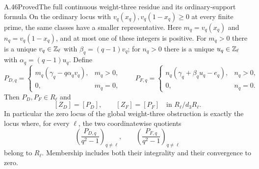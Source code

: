 \begin{statement}{A.46}{Proved}{The full continuous weight-three residue and its ordinary-support formula}
On the ordinary locus with $v_q(x_q),v_q(1-x_q)\ge0$ at every
finite prime, the same classes have a smaller representative.
Here $m_q=v_q(x_q)$ and $n_q=v_q(1-x_q)$, and at most one
of these integers is positive.  For $m_q>0$ there is a unique
$v_q\in\mathbb Z_\ell$ with $\beta_q=(q-1)v_q$; for $n_q>0$ there
is a unique $u_q\in\mathbb Z_\ell$ with $\alpha_q=(q-1)u_q$.
Define
\[
 P_{D,q}=
 \begin{cases}
 m_q(\gamma_q-q\alpha_qv_q),&m_q>0,\\
 0,&m_q=0,
 \end{cases}
 \qquad
 P_{F,q}=
 \begin{cases}
 n_q(\gamma_q+\beta_qu_q-e_q),&n_q>0,\\
 0,&n_q=0.
 \end{cases}
 \tag{A.46.7}
\]
Then $P_D,P_F\in R_\ell$ and
\[
                      [Z_D]=[P_D],\qquad [Z_F]=[P_F]
                            \quad\text{in }R_\ell/d_3R_\ell.
 \tag{A.46.8}
\]
In particular the zero locus of the global weight-three
obstruction is exactly the locus where, for every $\ell$,
the two coordinatewise quotients
\[
          \left(\frac{P_{D,q}}{q^2-1}\right)_{q\ne\ell},
          \qquad
          \left(\frac{P_{F,q}}{q^2-1}\right)_{q\ne\ell}
 \tag{A.46.9}
\]
belong to $R_\ell$.  Membership includes both their integrality
and their convergence to zero.
\end{statement}
